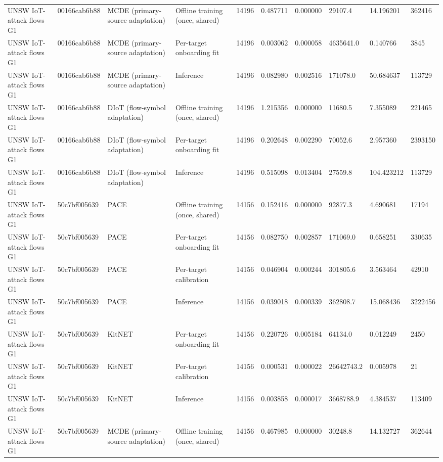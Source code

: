 \begin{tabular}{llllllllll}
UNSW IoT-attack flows G1 & 00166cab6b88 & MCDE (primary-source adaptation) & Offline training (once, shared) & 14196 & 0.487711 & 0.000000 & 29107.4 & 14.196201 & 362416 \\
UNSW IoT-attack flows G1 & 00166cab6b88 & MCDE (primary-source adaptation) & Per-target onboarding fit & 14196 & 0.003062 & 0.000058 & 4635641.0 & 0.140766 & 3845 \\
UNSW IoT-attack flows G1 & 00166cab6b88 & MCDE (primary-source adaptation) & Inference & 14196 & 0.082980 & 0.002516 & 171078.0 & 50.684637 & 113729 \\
UNSW IoT-attack flows G1 & 00166cab6b88 & DIoT (flow-symbol adaptation) & Offline training (once, shared) & 14196 & 1.215356 & 0.000000 & 11680.5 & 7.355089 & 221465 \\
UNSW IoT-attack flows G1 & 00166cab6b88 & DIoT (flow-symbol adaptation) & Per-target onboarding fit & 14196 & 0.202648 & 0.002290 & 70052.6 & 2.957360 & 2393150 \\
UNSW IoT-attack flows G1 & 00166cab6b88 & DIoT (flow-symbol adaptation) & Inference & 14196 & 0.515098 & 0.013404 & 27559.8 & 104.423212 & 113729 \\
UNSW IoT-attack flows G1 & 50c7bf005639 & PACE & Offline training (once, shared) & 14156 & 0.152416 & 0.000000 & 92877.3 & 4.690681 & 17194 \\
UNSW IoT-attack flows G1 & 50c7bf005639 & PACE & Per-target onboarding fit & 14156 & 0.082750 & 0.002857 & 171069.0 & 0.658251 & 330635 \\
UNSW IoT-attack flows G1 & 50c7bf005639 & PACE & Per-target calibration & 14156 & 0.046904 & 0.000244 & 301805.6 & 3.563464 & 42910 \\
UNSW IoT-attack flows G1 & 50c7bf005639 & PACE & Inference & 14156 & 0.039018 & 0.000339 & 362808.7 & 15.068436 & 3222456 \\
UNSW IoT-attack flows G1 & 50c7bf005639 & KitNET & Per-target onboarding fit & 14156 & 0.220726 & 0.005184 & 64134.0 & 0.012249 & 2450 \\
UNSW IoT-attack flows G1 & 50c7bf005639 & KitNET & Per-target calibration & 14156 & 0.000531 & 0.000022 & 26642743.2 & 0.005978 & 21 \\
UNSW IoT-attack flows G1 & 50c7bf005639 & KitNET & Inference & 14156 & 0.003858 & 0.000017 & 3668788.9 & 4.384537 & 113409 \\
UNSW IoT-attack flows G1 & 50c7bf005639 & MCDE (primary-source adaptation) & Offline training (once, shared) & 14156 & 0.467985 & 0.000000 & 30248.8 & 14.132727 & 362644 \\

\end{tabular}

